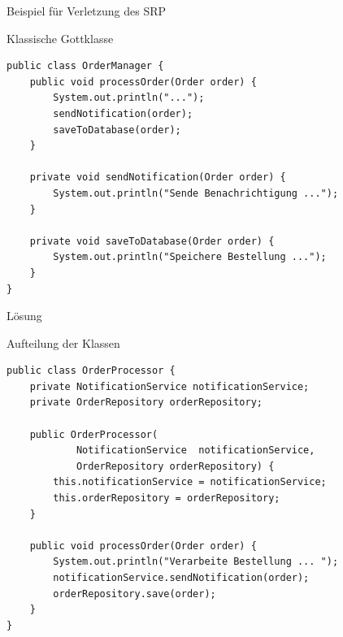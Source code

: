 \begin{frame}[fragile]{Beispiel für Verletzung des SRP}
	\begin{alertblock}{Klassische Gottklasse}
        \begin{lstlisting}
public class OrderManager {
    public void processOrder(Order order) {
        System.out.println("...");
        sendNotification(order);
        saveToDatabase(order);
    }

    private void sendNotification(Order order) {
        System.out.println("Sende Benachrichtigung ...");
    }

    private void saveToDatabase(Order order) {
        System.out.println("Speichere Bestellung ...");
    }
}
        \end{lstlisting} 		
 	\end{alertblock}
\end{frame}

\begin{frame}[fragile]{Lösung}
	\begin{exampleblock}{Aufteilung der Klassen}
        \begin{lstlisting}
public class OrderProcessor {
    private NotificationService notificationService;
    private OrderRepository orderRepository;

    public OrderProcessor(
            NotificationService  notificationService, 
            OrderRepository orderRepository) {
        this.notificationService = notificationService;
        this.orderRepository = orderRepository;
    }

    public void processOrder(Order order) {
        System.out.println("Verarbeite Bestellung ... ");
        notificationService.sendNotification(order);
        orderRepository.save(order);
    }
}
        \end{lstlisting} 		
 	\end{exampleblock}
\end{frame}

